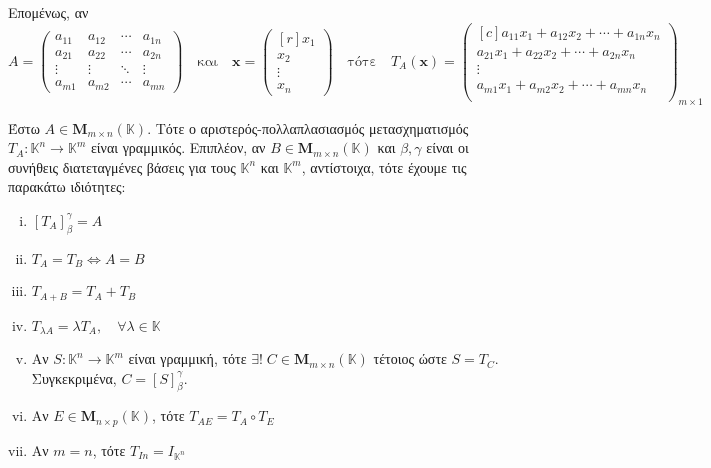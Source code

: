 Επομένως, αν 
\[
  A = 
  \begin{pmatrix}
    a_{11} & a_{12} & \cdots & a_{1n} \\
    a_{21} & a_{22} & \cdots & a_{2n} \\
    \vdots & \vdots & \ddots & \vdots \\
    a_{m1} & a_{m2} & \cdots & a_{mn} 
  \end{pmatrix} \quad \text{και} \quad \mathbf{x} = 
  \begin{pmatrix*}[r] x_{1} \\ x_{2} \\ \vdots \\ x_{n} \end{pmatrix*}
  \quad \text{τότε} \quad T_{A}(\mathbf{x}) = 
  \begin{pmatrix*}[c]
    a_{11} x_{1} + a_{12} x_{2} + \cdots + a_{1n}x_{n} \\
    a_{21} x_{1} + a_{22} x_{2} + \cdots + a_{2n}x_{n} \\ 
    \vdots \\
    a_{m1} x_{1} + a_{m2} x_{2} + \cdots + a_{mn}x_{n} \\ 
  \end{pmatrix*}_{m \times 1}
\] 

\begin{thm}
  Έστω $ A \in \textbf{M}_{m \times n}(\mathbb{K}) $. Τότε ο αριστερός-πολλαπλασιασμός
  μετασχηματισμός $ T_{A} \colon \mathbb{K}^{n} \to \mathbb{K}^{m} $ 
  είναι γραμμικός. Επιπλέον, αν $ B \in \textbf{M}_{m \times n}(\mathbb{K}) $ 
  και $ \beta , \gamma $ είναι οι συνήθεις διατεταγμένες βάσεις για τους 
  $ \mathbb{K}^{n} $ και $ \mathbb{K}^{m} $, αντίστοιχα, τότε έχουμε τις παρακάτω 
  ιδιότητες:
  \begin{enumerate}[i)]
    \item $ [T_{A}]_{\beta}^{\gamma} = A $
    \item $ T_{A} = T_{B} \Leftrightarrow A = B $ 
    \item $ T_{A+B} = T_{A} + T_{B} $
    \item $ T_{\lambda A} = \lambda T_{A}, \quad \forall \lambda \in \mathbb{K} $
    \item Αν $ S \colon \mathbb{K}^{n} \to \mathbb{K}^{m} $ είναι γραμμική, τότε 
      $ \exists ! \; C \in \textbf{M}_{m \times n}(\mathbb{K}) $ τέτοιος ώστε 
      $ S=T_{C} $.  Συγκεκριμένα, $ C = [S]_{\beta}^{\gamma} $.
    \item Αν $ E \in \textbf{M}_{n \times p}(\mathbb{K}) $, τότε $ T_{AE} = T_{A} 
      \circ T_{E} $ 
    \item Αν $ m=n $, τότε $ T_{I{n}} = I_{\mathbb{K}^{n}} $
  \end{enumerate}
\end{thm}

